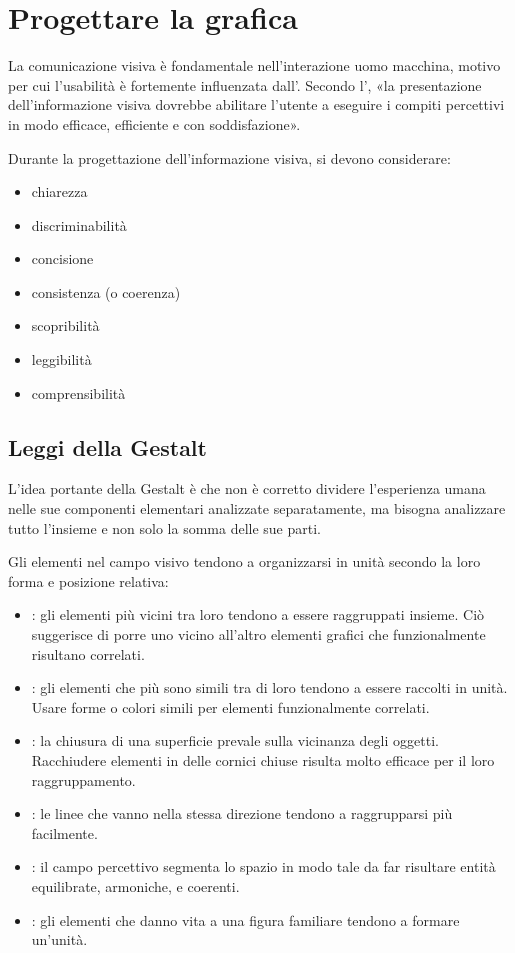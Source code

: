 \section{Progettare la grafica}

La comunicazione visiva è fondamentale nell'interazione uomo macchina, motivo per cui l'usabilità è fortemente influenzata dall'. Secondo l', «la presentazione dell’informazione visiva dovrebbe abilitare l’utente a eseguire i compiti percettivi in modo efficace, efficiente e con soddisfazione».

Durante la progettazione dell'informazione visiva, si devono considerare:

\begin{itemize}
    \item chiarezza
    \item discriminabilità
    \item concisione
    \item consistenza (o coerenza)
    \item scopribilità
    \item leggibilità
    \item comprensibilità
\end{itemize}

\subsection{Leggi della Gestalt}

L'idea portante della Gestalt è che non è corretto dividere l'esperienza umana nelle sue componenti elementari analizzate separatamente, ma bisogna analizzare tutto l'insieme e non solo la somma delle sue parti.

Gli elementi nel campo visivo tendono a organizzarsi in unità secondo la loro forma e posizione relativa:

\begin{itemize}
    \item {}: gli elementi più vicini tra loro tendono a essere raggruppati insieme. Ciò suggerisce di porre uno vicino all'altro elementi grafici che funzionalmente risultano correlati.
    \item {}: gli elementi che più sono simili tra di loro tendono a essere raccolti in unità. Usare forme o colori simili per elementi funzionalmente correlati.
    \item {}: la chiusura di una superficie prevale sulla vicinanza degli oggetti. Racchiudere elementi in delle cornici chiuse risulta molto efficace per il loro raggruppamento.
    \item {}: le linee che vanno nella stessa direzione tendono a raggrupparsi più facilmente.
    \item {}: il campo percettivo segmenta lo spazio in modo tale da far risultare entità equilibrate, armoniche, e coerenti.
    \item {}: gli elementi che danno vita a una figura familiare tendono a formare un'unità.
\end{itemize}
